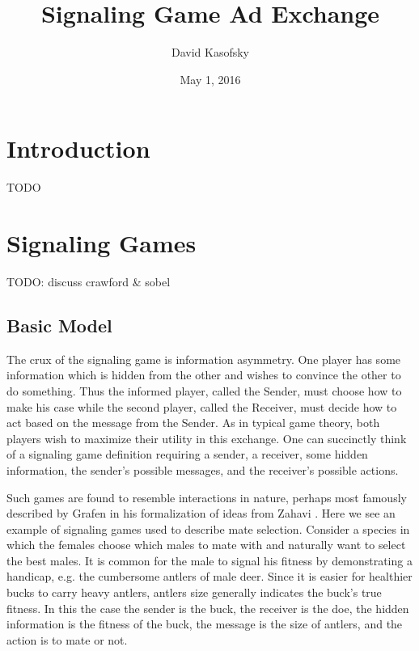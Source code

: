 \documentclass{article}
\title{Signaling Game Ad Exchange}
\author{David Kasofsky}
\date{May 1, 2016}
\begin{document}
\maketitle

\newpage

\tableofcontents

\newpage

\section{Introduction}

TODO

\newpage

\section{Signaling Games}

TODO: discuss crawford \& sobel

\subsection{Basic Model}

The crux of the signaling game is information asymmetry. One player has some information which is hidden from the other and wishes to convince the other to do something. Thus the informed player, called the Sender, must choose how to make his case while the second player, called the Receiver, must decide how to act based on the message from the Sender. As in typical game theory, both players wish to maximize their utility in this exchange. One can succinctly think of a signaling game definition requiring a sender, a receiver, some hidden information, the sender's possible messages, and the receiver's possible actions.

Such games are found to resemble interactions in nature, perhaps most famously described by Grafen \cite{grafen1} in his formalization of ideas from Zahavi \cite{zahavi1}. Here we see an example of signaling games used to describe mate selection. Consider a species in which the females choose which males to mate with and naturally want to select the best males. It is common for the male to signal his fitness by demonstrating a handicap, e.g. the cumbersome antlers of male deer. Since it is easier for healthier bucks to carry heavy antlers, antlers size generally indicates the buck's true fitness. In this the case the sender is the buck, the receiver is the doe, the hidden information is the fitness of the buck, the message is the size of antlers, and the action is to mate or not. 
\end{document}
